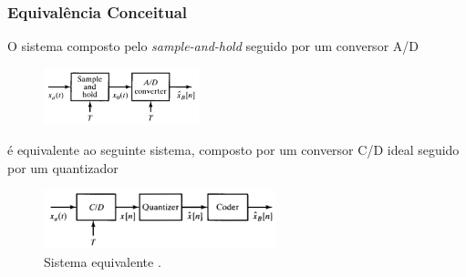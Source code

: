 \begin{frame}%
  \frametitle{Equivalência Conceitual}
  O sistema composto pelo \textit{sample-and-hold} seguido por um conversor A/D
  \begin{figure}[h!]
  \centering
  \includegraphics[width=0.4\textwidth]{images/oppenheim_fig445.png}
  \label{fig:oppenheim_fig445_2}
  \end{figure}
  é equivalente ao seguinte sistema, composto por um conversor C/D ideal seguido por um quantizador
  \begin{figure}[h!]
  \centering
  \includegraphics[width=0.6\textwidth]{images/oppenheim_fig447.png}
  \caption{Sistema equivalente \citep{oppenheim2009}.}
  \label{fig:oppenheim_fig447}
  \end{figure}
\end{frame}

